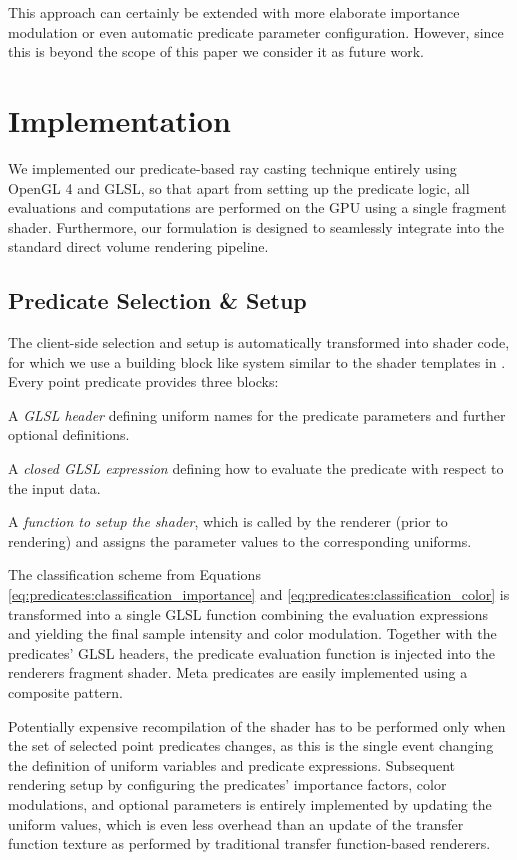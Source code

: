 This approach can certainly be extended with more elaborate importance modulation or even automatic predicate parameter configuration. 
However, since this is beyond the scope of this paper we consider it as future work. 


\section*{Implementation}


We implemented our predicate-based ray casting technique entirely using OpenGL 4 and GLSL, so that apart from setting up the predicate logic, all evaluations and computations are performed on the GPU using a single fragment shader. 
Furthermore, our formulation is designed to seamlessly integrate into the standard direct volume rendering pipeline. 


\subsection{Predicate Selection \& Setup}
The client-side selection and setup is automatically transformed into shader code, for which we use a building block like system similar to the shader templates in \cite{Rautek08}. 
Every point predicate provides three blocks:
\begin{my_list_num}
	\item A \emph{GLSL header} defining uniform names for the predicate parameters and further optional definitions. 
	\item A \emph{closed GLSL expression} defining how to evaluate the predicate with respect to the input data. 
	\item A \emph{function to setup the shader}, which is called by the renderer (prior to rendering) and assigns the parameter values to the corresponding uniforms. 
\end{my_list_num}
The classification scheme from Equations \eqref{eq:predicates:classification_importance} and \eqref{eq:predicates:classification_color} is transformed into a single GLSL function combining the evaluation expressions and yielding the final sample intensity and color modulation. 
Together with the predicates' GLSL headers, the predicate evaluation function is injected into the renderers fragment shader. 
Meta predicates are easily implemented using a composite pattern. 

Potentially expensive recompilation of the shader has to be performed only when the set of selected point predicates changes, as this is the single event changing the definition of uniform variables and predicate expressions. 
Subsequent rendering setup by configuring the predicates' importance factors, color modulations, and optional parameters is entirely implemented by updating the uniform values, which is even less overhead than an update of the transfer function texture as performed by traditional transfer function-based renderers. 

